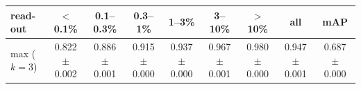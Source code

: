 \begin{tabular}{lcccccccc}
\toprule
read-out & $<$0.1\% & 0.1--0.3\% & 0.3--1\% & 1--3\% & 3--10\% & $>$10\% & all & mAP \\
\midrule
max ($k=3$) & 0.822 $\pm$ 0.002 & 0.886 $\pm$ 0.001 & 0.915 $\pm$ 0.000 & 0.937 $\pm$ 0.000 & 0.967 $\pm$ 0.001 & 0.980 $\pm$ 0.000 & 0.947 $\pm$ 0.001 & 0.687 $\pm$ 0.000 \\
\bottomrule
\end{tabular}
